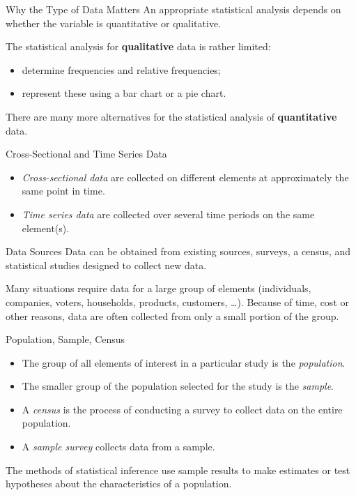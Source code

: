 \documentclass[10pt,aspectratio=169]{beamer}
\begin{document}
\begin{frame}{Why the Type of Data Matters}
  An appropriate statistical analysis depends on whether the variable is
  quantitative or qualitative.

  \vspace{0.8em}
  The statistical analysis for \textbf{qualitative} data is rather limited:
  \begin{itemize}
    \item determine frequencies and relative frequencies;
    \item represent these using a bar chart or a pie chart.
  \end{itemize}

  \vspace{0.8em}
  There are many more alternatives for the statistical analysis of
  \textbf{quantitative} data.
\end{frame}

\begin{frame}{Cross-Sectional and Time Series Data}
  \begin{itemize}
    \item \emph{Cross-sectional data} are collected on different elements at
          approximately the same point in time.
    \item \emph{Time series data} are collected over several time periods on the
          same element(s).
  \end{itemize}
\end{frame}

\begin{frame}{Data Sources}
  Data can be obtained from existing sources, surveys, a census, and statistical
  studies designed to collect new data.

  \vspace{0.8em}
  Many situations require data for a large group of elements (individuals,
  companies, voters, households, products, customers, \dots). Because of time,
  cost or other reasons, data are often collected from only a small portion of
  the group.
\end{frame}

\begin{frame}{Population, Sample, Census}
  \begin{itemize}
    \item The group of all elements of interest in a particular study is the
          \emph{population}.
    \item The smaller group of the population selected for the study is the
          \emph{sample}.
    \item A \emph{census} is the process of conducting a survey to collect data
          on the entire population.
    \item A \emph{sample survey} collects data from a sample.
  \end{itemize}

  \vspace{0.8em}
  The methods of statistical inference use sample results to make estimates or
  test hypotheses about the characteristics of a population.
\end{frame}
\end{document}
